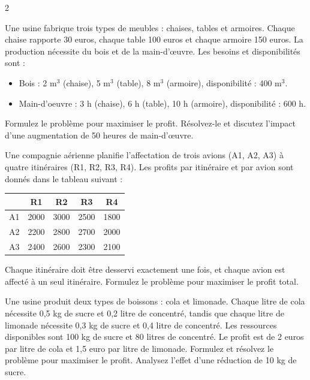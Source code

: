 \begin{multicols}{2}
\begin{exercice}
	Une usine fabrique trois types de meubles : chaises, tables et armoires. Chaque chaise rapporte 30 euros, chaque table 100 euros et chaque armoire 150 euros. La production nécessite du bois et de la main-d'œuvre. Les besoins et disponibilités sont :
	\begin{itemize}
		\item Bois : 2 m$^{3}$ (chaise), 5 m$^{3}$ (table), 8 m$^{3}$ (armoire), disponibilité : 400 m$^{3}$.
		\item Main-d'oeuvre : 3 h (chaise), 6 h (table), 10 h (armoire), disponibilité : 600 h.
	\end{itemize}
	Formulez le problème pour maximiser le profit. Résolvez-le et discutez l'impact d'une augmentation de 50 heures de main-d'œuvre.
\end{exercice}

\begin{exercice}
	Une compagnie aérienne planifie l'affectation de trois avions (A1, A2, A3) à quatre itinéraires (R1, R2, R3, R4). Les profits par itinéraire et par avion sont donnés dans le tableau suivant :
	\begin{center}
		\begin{tabular}{c|cccc}
			& R1 & R2 & R3 & R4 \\
			\hline
			A1 & 2000 & 3000 & 2500 & 1800 \\
			A2 & 2200 & 2800 & 2700 & 2000 \\
			A3 & 2400 & 2600 & 2300 & 2100 \\
		\end{tabular}
	\end{center}
	Chaque itinéraire doit être desservi exactement une fois, et chaque avion est affecté à un seul itinéraire. Formulez le problème pour maximiser le profit total.
\end{exercice}

\begin{exercice}
	Une usine produit deux types de boissons : cola et limonade. Chaque litre de cola nécessite 0,5 kg de sucre et 0,2 litre de concentré, tandis que chaque litre de limonade nécessite 0,3 kg de sucre et 0,4 litre de concentré. Les ressources disponibles sont 100 kg de sucre et 80 litres de concentré. Le profit est de 2 euros par litre de cola et 1,5 euro par litre de limonade. Formulez et résolvez le problème pour maximiser le profit. Analysez l'effet d'une réduction de 10 kg de sucre.
\end{exercice}


\end{multicols}
